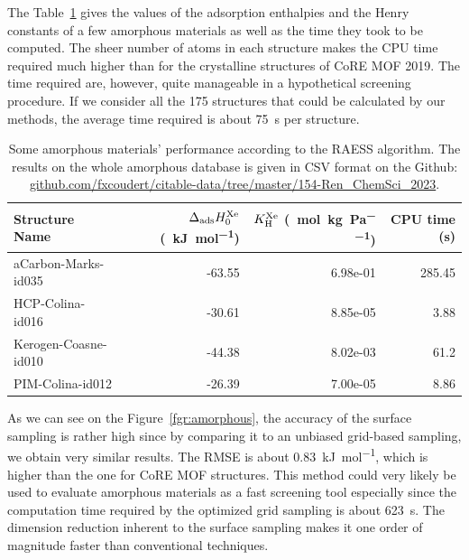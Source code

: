 \documentclass[main]{subfiles}
\begin{document}
The Table~\ref{tab:amorphous} gives the values of the adsorption enthalpies and the Henry constants of a few amorphous materials as well as the time they took to be computed. The sheer number of atoms in each structure makes the CPU time required much higher than for the crystalline structures of CoRE MOF 2019. The time required are, however, quite manageable in a hypothetical screening procedure. If we consider all the 175 structures that could be calculated by our methods, the average time required is about \SI{75}{\second} per structure. 

\begin{table}[hb]
  \begin{tabular}{|l|r|r|r|}
    \hline
    Structure Name & $\Delta_{\text{ads}}H_{\text{0}}^{\text{Xe}}$ (\SI{}{\kilo\joule\per\mole}) & $K_{\text{H}}^{\text{Xe}}$ (\SI{}{\mole\per\kilo\gram\per\pascal}) & CPU time (s) \\
    \hline
    aCarbon-Marks-id035 &                 -63.55 &            6.98e-01 & 285.45 \\
    HCP-Colina-id016 &                 -30.61 &            8.85e-05 & 3.88 \\
    Kerogen-Coasne-id010 &                 -44.38 &            8.02e-03 & 61.2 \\
    PIM-Colina-id012 &                 -26.39 &            7.00e-05 & 8.86 \\
    \hline
    \end{tabular}
    \caption{Some amorphous materials' performance according to the RAESS algorithm. The results on the whole amorphous database is given in CSV format on the Github: \url{github.com/fxcoudert/citable-data/tree/master/154-Ren_ChemSci_2023}.}\label{tab:amorphous}
\end{table}

As we can see on the Figure~\ref{fgr:amorphous}, the accuracy of the surface sampling is rather high since by comparing it to an unbiased grid-based sampling, we obtain very similar results. The RMSE is about \SI{0.83}{\kJ\per\mol}, which is higher than the one for CoRE MOF structures. This method could very likely be used to evaluate amorphous materials as a fast screening tool especially since the computation time required by the optimized grid sampling is about \SI{623}{\second}. The dimension reduction inherent to the surface sampling makes it one order of magnitude faster than conventional techniques.
\end{document}
